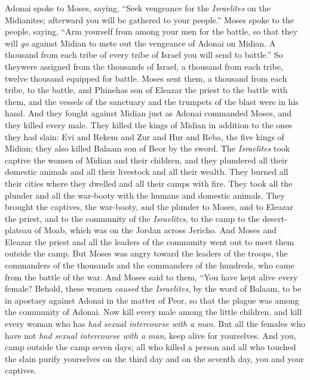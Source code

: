\begin{biblechapter} %
 Adonai spoke to Moses, saying,
\verse “Seek vengeance for the \textit{Israelites} on the Midianites; afterward you will be gathered to your people.”
\verse Moses spoke to the people, saying, “Arm yourself from among your men for the battle, so that they will \textit{go} against Midian to mete out the vengeance of Adonai on Midian.
\verse A thousand from each tribe of every tribe of Israel you will send to battle.”
\verse So theywere assigned from the thousands of Israel, a thousand from each tribe, twelve thousand equipped for battle.
\verse Moses sent them, a thousand from each tribe, to the battle, and Phinehas son of Eleazar the priest to the battle with them, and the vessels of the sanctuary and the trumpets of the blast were in his hand.
\verse And they fought against Midian just as Adonai commanded Moses, and they killed every male.
\verse They killed the kings of Midian in addition to the ones they had slain: Evi and Rekem and Zur and Hur and Reba, the five kings of Midian; they also killed Balaam son of Beor by the sword.
\verse The \textit{Israelites} took captive the women of Midian and their children, and they plundered all their domestic animals and all their livestock and all their wealth.
\verse They burned all their cities where they dwelled and all their camps with fire.
\verse They took all the plunder and all the war-booty with the humans and domestic animals.
\verse They brought the captives, the war-booty, and the plunder to Moses, and to Eleazar the priest, and to the community of the \textit{Israelites}, to the camp to the desert-plateau of Moab, which was on the Jordan across Jericho.
\verse And Moses and Eleazar the priest and all the leaders of the community went out to meet them outside the camp.
\verse But Moses was angry toward the leaders of the troops, the commanders of the thousands and the commanders of the hundreds, who came from the battle of the war.
\verse And Moses said to them, “You have kept alive every female?
\verse Behold, these women \textit{caused} the \textit{Israelites}, by the word of Balaam, to be in apostasy against Adonai in the matter of Peor, so that the plague was among the community of Adonai.
\verse Now kill every male among the little children, and kill every woman who has \textit{had sexual intercourse with a man}.
\verse But all the females who have not \textit{had sexual intercourse with a man}, keep alive for yourselves.
\verse And you, camp outside the camp seven days; all who killed a person and all who touched the slain purify yourselves on the third day and on the seventh day, you and your captives.

\end{biblechapter}
